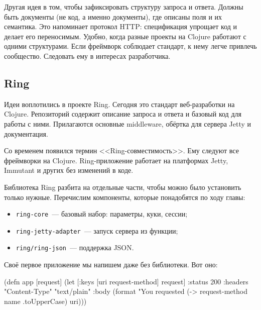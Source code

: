 Другая идея в том, чтобы зафиксировать структуру запроса и ответа. Должны быть
документы (не код, а именно документы), где описаны поля и их семантика. Это
напоминает протокол HTTP: спецификация упрощает код и делает его
переносимым. Удобно, когда разные проекты на Clojure работают с одними
структурами. Если фреймворк соблюдает стандарт, к нему легче привлечь
сообщество. Следовать ему в интересах разработчика.

\subsection{Ring}

\label{ring-jetty}

Идеи воплотились в проекте Ring.
Сегодня это стандарт веб-разработки на Clojure. Репозиторий содержит описание
запроса и ответа и базовый код для работы с ними. Прилагаются основные middleware,
обёртка для сервера Jetty и документация.


Со временем появился термин <<Ring-совместимость>>. Ему следуют все фреймворки
на Clojure. Ring-приложение работает на платформах Jetty, Immutant и других без
изменений в коде.

Библиотека Ring разбита на отдельные части, чтобы можно было установить только
нужные. Перечислим компоненты, которые понадобятся по ходу главы:

\begin{itemize}

\item
  \verb|ring-core|~--- базовый набор: параметры, куки, сессии;

\item
  \verb|ring-jetty-adapter|~--- запуск сервера из функции;

\item
  \verb|ring/ring-json|~--- поддержка JSON.

\end{itemize}

Своё первое приложение мы напишем даже без библиотеки. Вот оно:


\label{first-handler}

\begin{english}
  \begin{clojure}
(defn app [request]
  (let [{:keys [uri request-method]} request]
    {:status 200
     :headers {"Content-Type" "text/plain"}
     :body (format "You requested %
                   (-> request-method name .toUpperCase)
                   uri)}))
  \end{clojure}
\end{english}

